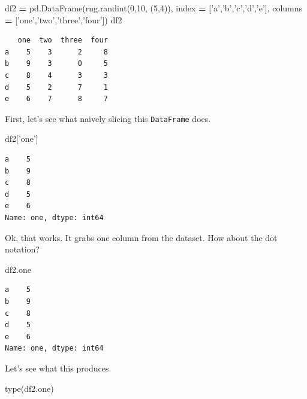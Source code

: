 \documentclass[
  letterpaper,
]{scrbook}
\newenvironment{Shaded}{\begin{snugshade}}{\end{snugshade}}
\newcommand{\BuiltInTok}[1]{#1}
\newcommand{\DecValTok}[1]{\textcolor[rgb]{0.00,0.00,0.81}{#1}}
\newcommand{\NormalTok}[1]{#1}
\newcommand{\OperatorTok}[1]{\textcolor[rgb]{0.81,0.36,0.00}{\textbf{#1}}}
\newcommand{\StringTok}[1]{\textcolor[rgb]{0.31,0.60,0.02}{#1}}
\begin{document}
\begin{Shaded}
\begin{Highlighting}[]
\NormalTok{df2 }\OperatorTok{=}\NormalTok{ pd.DataFrame(rng.randint(}\DecValTok{0}\NormalTok{,}\DecValTok{10}\NormalTok{, (}\DecValTok{5}\NormalTok{,}\DecValTok{4}\NormalTok{)), }
\NormalTok{                  index }\OperatorTok{=}\NormalTok{ [}\StringTok{'a'}\NormalTok{,}\StringTok{'b'}\NormalTok{,}\StringTok{'c'}\NormalTok{,}\StringTok{'d'}\NormalTok{,}\StringTok{'e'}\NormalTok{],}
\NormalTok{                  columns }\OperatorTok{=}\NormalTok{ [}\StringTok{'one'}\NormalTok{,}\StringTok{'two'}\NormalTok{,}\StringTok{'three'}\NormalTok{,}\StringTok{'four'}\NormalTok{])}
\NormalTok{df2}
\end{Highlighting}
\end{Shaded}

\begin{verbatim}
   one  two  three  four
a    5    3      2     8
b    9    3      0     5
c    8    4      3     3
d    5    2      7     1
e    6    7      8     7
\end{verbatim}

First, let's see what naively slicing this \texttt{DataFrame} does.

\begin{Shaded}
\begin{Highlighting}[]
\NormalTok{df2[}\StringTok{'one'}\NormalTok{]}
\end{Highlighting}
\end{Shaded}

\begin{verbatim}
a    5
b    9
c    8
d    5
e    6
Name: one, dtype: int64
\end{verbatim}

Ok, that works. It grabs one column from the dataset. How about the dot notation?

\begin{Shaded}
\begin{Highlighting}[]
\NormalTok{df2.one}
\end{Highlighting}
\end{Shaded}

\begin{verbatim}
a    5
b    9
c    8
d    5
e    6
Name: one, dtype: int64
\end{verbatim}

Let's see what this produces.

\begin{Shaded}
\begin{Highlighting}[]
\BuiltInTok{type}\NormalTok{(df2.one)}
\end{Highlighting}
\end{Shaded}
\end{document}

